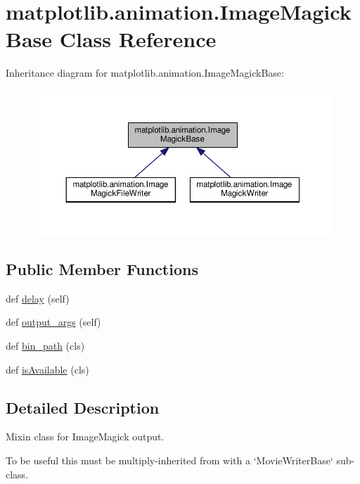 \hypertarget{classmatplotlib_1_1animation_1_1ImageMagickBase}{}\section{matplotlib.\+animation.\+Image\+Magick\+Base Class Reference}
\label{classmatplotlib_1_1animation_1_1ImageMagickBase}


Inheritance diagram for matplotlib.\+animation.\+Image\+Magick\+Base\+:
\nopagebreak
\begin{figure}[H]
\begin{center}
\leavevmode
\includegraphics[width=350pt]{classmatplotlib_1_1animation_1_1ImageMagickBase__inherit__graph}
\end{center}
\end{figure}
\subsection*{Public Member Functions}
\begin{DoxyCompactItemize}
\item 
def \hyperlink{classmatplotlib_1_1animation_1_1ImageMagickBase_a8c98496ecebbe99cf5a23bd3a716d27e}{delay} (self)
\item 
def \hyperlink{classmatplotlib_1_1animation_1_1ImageMagickBase_a5ff627bf27c719ac025e642b7f3947a0}{output\+\_\+args} (self)
\item 
def \hyperlink{classmatplotlib_1_1animation_1_1ImageMagickBase_a2fb673fecbd2ce444b258eefa64d8b63}{bin\+\_\+path} (cls)
\item 
def \hyperlink{classmatplotlib_1_1animation_1_1ImageMagickBase_a54d6d0f834520d1e7fdce1c7d61586c3}{is\+Available} (cls)
\end{DoxyCompactItemize}


\subsection{Detailed Description}
\begin{DoxyVerb}Mixin class for ImageMagick output.

To be useful this must be multiply-inherited from with a
`MovieWriterBase` sub-class.
\end{DoxyVerb}
 

